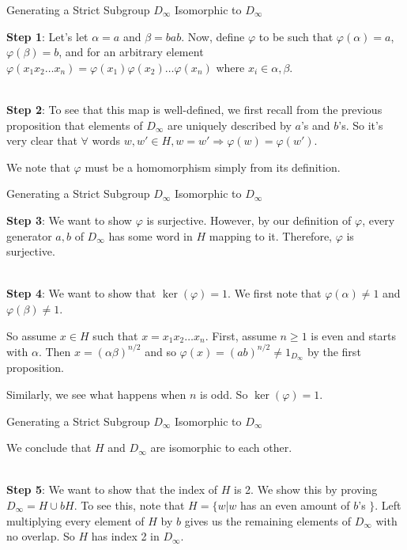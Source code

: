 \documentclass[usenames,dvipsnames]{beamer}
\begin{document}
\begin{frame}{Generating a Strict Subgroup $D_\infty$ Isomorphic to $D_\infty$}

\textbf{Step 1}: Let's let $\alpha=a$ and $\beta=bab$. Now, define $\varphi$ to be such that
$\varphi(\alpha)=a$, $\varphi(\beta)=b$, and for an arbitrary element $\varphi(x_{1}x_{2}\ldots
x_{n})=\varphi(x_{1})\varphi(x_{2})\ldots \varphi(x_{n})$ where $x_{i}\in {\alpha, \beta}$. \\~\\

\pause{}

\textbf{Step 2}: To see that this map is well-defined, we first recall from the previous proposition that
elements of $D_\infty$ are uniquely described by $a$'s and $b$'s. So it's very clear that $\forall$ words
$w,w'\in H, w=w' \Rightarrow \varphi(w)=\varphi(w')$.

\pause{}

We note that $\varphi$ must be a homomorphism simply from its definition.

\end{frame}

\begin{frame}{Generating a Strict Subgroup $D_\infty$ Isomorphic to $D_\infty$}

\textbf{Step 3}: We want to show $\varphi$ is surjective. However, by our definition of $\varphi$, every
generator ${a,b}$ of $D_\infty$ has some word in $H$ mapping to it. Therefore, $\varphi$ is surjective.
\\~\\

\pause{}

\textbf{Step 4}: We want to show that $\ker(\varphi)={1}$. We first note that $\varphi(\alpha)\neq 1$ and
$\varphi(\beta)\neq 1$.

\pause{}

So assume $x\in H$ such that $x=x_{1}x_{2}\ldots x_{n}$. First, assume $n\geq 1$ is even and starts with
$\alpha$. Then $x=(\alpha\beta)^{n/2}$ and so $\varphi(x)=(ab)^{n/2}\neq 1_{D_\infty}$ by the first
proposition.

\pause{}

Similarly, we see what happens when $n$ is odd. So $\ker(\varphi)={1}$.

\end{frame}

\begin{frame}{Generating a Strict Subgroup $D_\infty$ Isomorphic to $D_\infty$}

We conclude that $H$ and $D_\infty$ are isomorphic to each other. \\~\\

\pause{}

\textbf{Step 5}: We want to show that the index of $H$ is 2. We show this by proving $D_\infty=H\cup bH$.
\pause{} To see this, note that $H=\{ w | w $ has an even amount of $b$'s $\}$. Left multiplying every
element of $H$ by $b$ gives us the remaining elements of $D_\infty$ with no overlap. So $H$ has index 2 in
$D_\infty$.

\end{frame}
\end{document}
